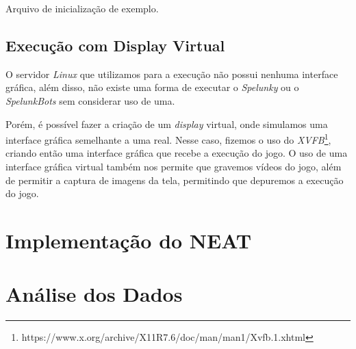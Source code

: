 \begin{algorithm}[H]

\caption[Arquivo de inicialização de exemplo.]
{\label{alg:ini-file}Arquivo de inicialização de exemplo.}
\end{algorithm}

\subsection{\label{sub:virtual-display}Execução com Display Virtual}

O servidor \textit{Linux} que utilizamos para a execução não possui nenhuma
interface gráfica, além disso, não existe uma forma de executar o
\textit{Spelunky} ou o \textit{SpelunkBots} sem considerar uso de uma.

Porém, é possível fazer a criação de um \textit{display} virtual, onde
simulamos uma interface gráfica semelhante a uma real. Nesse caso, fizemos o
uso do
\textit{XVFB}\footnote{https://www.x.org/archive/X11R7.6/doc/man/man1/Xvfb.1.xhtml},
criando então uma interface gráfica que recebe a execução do jogo. O uso de uma
interface gráfica virtual também nos permite que gravemos vídeos do jogo, além
de permitir a captura de imagens da tela, permitindo que depuremos a execução
do jogo.

\section{\label{section:neat-details}Implementação do NEAT}


\section{\label{section:analytics}Análise dos Dados}

